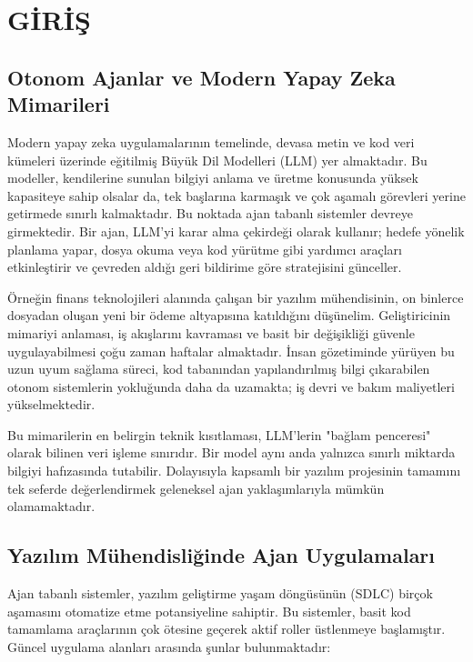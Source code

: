 \chapter{GİRİŞ}
\label{ch:giris}

\section{Otonom Ajanlar ve Modern Yapay Zeka Mimarileri}
\label{sec:ajan-mimari}

Modern yapay zeka uygulamalarının temelinde, devasa metin ve kod veri kümeleri üzerinde eğitilmiş Büyük Dil Modelleri (LLM) yer almaktadır. Bu modeller, kendilerine sunulan bilgiyi anlama ve üretme konusunda yüksek kapasiteye sahip olsalar da, tek başlarına karmaşık ve çok aşamalı görevleri yerine getirmede sınırlı kalmaktadır. Bu noktada ajan tabanlı sistemler devreye girmektedir. Bir ajan, LLM'yi karar alma çekirdeği olarak kullanır; hedefe yönelik planlama yapar, dosya okuma veya kod yürütme gibi yardımcı araçları etkinleştirir ve çevreden aldığı geri bildirime göre stratejisini günceller.

Örneğin finans teknolojileri alanında çalışan bir yazılım mühendisinin, on binlerce dosyadan oluşan yeni bir ödeme altyapısına katıldığını düşünelim. Geliştiricinin mimariyi anlaması, iş akışlarını kavraması ve basit bir değişikliği güvenle uygulayabilmesi çoğu zaman haftalar almaktadır. İnsan gözetiminde yürüyen bu uzun uyum sağlama süreci, kod tabanından yapılandırılmış bilgi çıkarabilen otonom sistemlerin yokluğunda daha da uzamakta; iş devri ve bakım maliyetleri yükselmektedir.

Bu mimarilerin en belirgin teknik kısıtlaması, LLM'lerin "bağlam penceresi" olarak bilinen veri işleme sınırıdır. Bir model aynı anda yalnızca sınırlı miktarda bilgiyi hafızasında tutabilir. Dolayısıyla kapsamlı bir yazılım projesinin tamamını tek seferde değerlendirmek geleneksel ajan yaklaşımlarıyla mümkün olamamaktadır.

\section{Yazılım Mühendisliğinde Ajan Uygulamaları}
\label{sec:ajan-uygulamalari}

Ajan tabanlı sistemler, yazılım geliştirme yaşam döngüsünün (SDLC) birçok aşamasını otomatize etme potansiyeline sahiptir. Bu sistemler, basit kod tamamlama araçlarının çok ötesine geçerek aktif roller üstlenmeye başlamıştır. Güncel uygulama alanları arasında şunlar bulunmaktadır:

